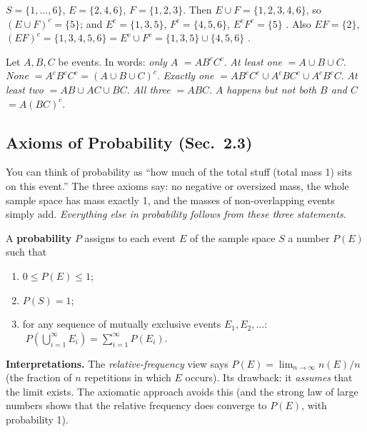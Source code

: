 \documentclass[11pt]{article}
\let\oldsubsection\subsection
\renewcommand{\subsection}{\Needspace{14\baselineskip}\oldsubsection}
\begin{document}
\begin{exbox}
$S=\{1,\dots,6\}$, $E=\{2,4,6\}$, $F=\{1,2,3\}$. Then $E\cup F=\{1,2,3,4,6\}$, so $(E\cup F)^c=\{5\}$; and $E^c=\{1,3,5\}$, $F^c=\{4,5,6\}$, $E^cF^c=\{5\}$ \checkmark. Also $EF=\{2\}$, $(EF)^c=\{1,3,4,5,6\}=E^c\cup F^c=\{1,3,5\}\cup\{4,5,6\}$ \checkmark.
\end{exbox}

\begin{methodbox}
Let $A,B,C$ be events. In words: \emph{only $A$} $=AB^cC^c$. \emph{At least one} $=A\cup B\cup C$. \emph{None} $=A^cB^cC^c=(A\cup B\cup C)^c$. \emph{Exactly one} $=AB^cC^c\cup A^cBC^c\cup A^cB^cC$. \emph{At least two} $=AB\cup AC\cup BC$. \emph{All three} $=ABC$. \emph{$A$ happens but not both $B$ and $C$} $=A(BC)^c$.
\end{methodbox}

\subsection{Axioms of Probability (Sec.\ 2.3)}

\begin{ideabox}
You can think of probability as ``how much of the total stuff (total mass 1) sits on this event.'' The three axioms say: no negative or oversized mass, the whole sample space has mass exactly 1, and the masses of non-overlapping events simply add. \emph{Everything else in probability follows from these three statements.}
\end{ideabox}

\begin{defbox}
A \textbf{probability} $P$ assigns to each event $E$ of the sample space $S$ a number $P(E)$ such that
\begin{enumerate}
\item $0\le P(E)\le1$;
\item $P(S)=1$;
\item for any sequence of mutually exclusive events $E_1,E_2,\dots$: $\;P\!\left(\bigcup_{i=1}^\infty E_i\right)=\sum_{i=1}^\infty P(E_i)$.
\end{enumerate}
\end{defbox}

\textbf{Interpretations.} The \emph{relative-frequency} view says $P(E)=\lim_{n\to\infty}n(E)/n$ (the fraction of $n$ repetitions in which $E$ occurs). Its drawback: it \emph{assumes} that the limit exists. The axiomatic approach avoids this (and the strong law of large numbers shows that the relative frequency does converge to $P(E)$, with probability 1).
\end{document}
